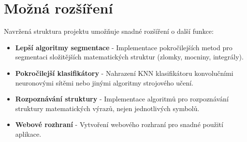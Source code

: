 \section{Možná rozšíření}

Navržená struktura projektu umožňuje snadné rozšíření o další funkce:

\begin{itemize}
    \item \textbf{Lepší algoritmy segmentace} - Implementace pokročilejších metod pro segmentaci složitějších matematických struktur (zlomky, mocniny, integrály).
    
    \item \textbf{Pokročilejší klasifikátory} - Nahrazení KNN klasifikátoru konvolučními neuronovými sítěmi nebo jinými algoritmy strojového učení.
    
    \item \textbf{Rozpoznávání struktury} - Implementace algoritmů pro rozpoznávání struktury matematických výrazů, nejen jednotlivých symbolů.
    
    \item \textbf{Webové rozhraní} - Vytvoření webového rozhraní pro snadné použití aplikace.
\end{itemize}